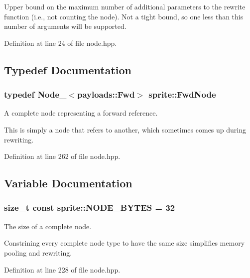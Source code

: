 Upper bound on the maximum number of additional parameters to the rewrite function (i.e., not counting the node). Not a tight bound, so one less than this number of arguments will be supported. 

Definition at line 24 of file node.hpp.

\subsection{Typedef Documentation}
\subsubsection{\setlength{\rightskip}{0pt plus 5cm}typedef Node\_\-$<$payloads::Fwd$>$ {\bf sprite::Fwd\-Node}}\label{namespacesprite_file_a32}


A complete node representing a forward reference. 

This is simply a node that refers to another, which sometimes comes up during rewriting. 

Definition at line 262 of file node.hpp.

\subsection{Variable Documentation}
\subsubsection{\setlength{\rightskip}{0pt plus 5cm}size\_\-t const {\bf sprite::NODE\_\-BYTES} = 32}\label{namespacesprite_file_a25}


The size of a complete node. 

Constrining every complete node type to have the same size simplifies memory pooling and rewriting. 

Definition at line 228 of file node.hpp.